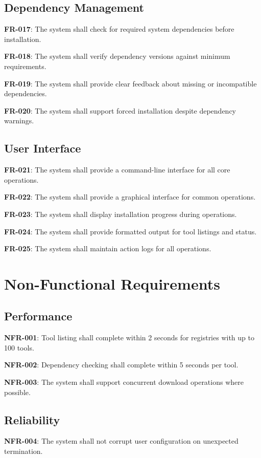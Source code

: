 \documentclass[12pt,a4paper]{report}
\begin{document}
\subsection{Dependency Management}
\textbf{FR-017}: The system shall check for required system dependencies before installation.

\textbf{FR-018}: The system shall verify dependency versions against minimum requirements.

\textbf{FR-019}: The system shall provide clear feedback about missing or incompatible dependencies.

\textbf{FR-020}: The system shall support forced installation despite dependency warnings.

\subsection{User Interface}
\textbf{FR-021}: The system shall provide a command-line interface for all core operations.

\textbf{FR-022}: The system shall provide a graphical interface for common operations.

\textbf{FR-023}: The system shall display installation progress during operations.

\textbf{FR-024}: The system shall provide formatted output for tool listings and status.

\textbf{FR-025}: The system shall maintain action logs for all operations.

\section{Non-Functional Requirements}
\subsection{Performance}
\textbf{NFR-001}: Tool listing shall complete within 2 seconds for registries with up to 100 tools.

\textbf{NFR-002}: Dependency checking shall complete within 5 seconds per tool.

\textbf{NFR-003}: The system shall support concurrent download operations where possible.

\subsection{Reliability}
\textbf{NFR-004}: The system shall not corrupt user configuration on unexpected termination.
\end{document}
